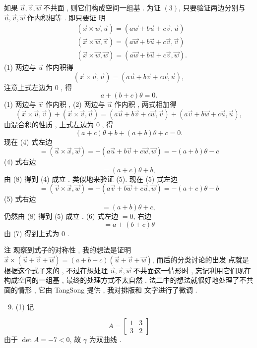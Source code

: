 \documentclass[10pt]{article}
\begin{document}
 如果  $\vec{u}, \vec{v}, \vec{w}$  不共面 ,  则它们构成空间一组基 .  为证  $(3)$,  只要验证两边分别与  $\vec{u}, \vec{v}, \vec{w}$  作内积相等 .  即只要证   明 
$$
\begin{aligned}
&(\vec{x} \times \vec{w}, \vec{u})=(a \vec{w}+b \vec{u}+c \vec{v}, \vec{u}) \\
&(\vec{x} \times \vec{w}, \vec{v})=(a \vec{w}+b \vec{u}+c \vec{v}, \vec{v}) \\
&(\vec{x} \times \vec{w}, \vec{w})=(a \vec{w}+b \vec{u}+c \vec{v}, \vec{w}) .
\end{aligned}
$$
(1)  两边与  $\vec{u}$  作内积得 
$$
(\vec{x} \times \vec{u}, \vec{u})=(a \vec{u}+b \vec{v}+c \vec{w}, \vec{u}),
$$
 注意上式左边为  0 ,  得 
$$
a+(b+c) \theta=0 .
$$
(1)  两边与  $\vec{v}$  作内积 , (2)  两边与  $\vec{u}$  作内积 ,  两式相加得 
$$
(\vec{x} \times \vec{u}, \vec{v})+(\vec{x} \times \vec{v}, \vec{u})=(a \vec{u}+b \vec{v}+c \vec{w}, \vec{v})+(a \vec{v}+b \vec{w}+c \vec{u}, \vec{u}),
$$
 由混合积的性质 ,  上式左边为  0 ,  得 
$$
(a+c) \theta+b+(a+b) \theta+c=0 .
$$
 现在  (4)  式左边 
$$
=(\vec{u} \times \vec{x}, \vec{w})=-(a \vec{u}+b \vec{v}+c \vec{w}, \vec{w})=-(a+b) \theta-c
$$
(4)  式右边 
$$
=(a+c) \theta+b,
$$
 由  (8)  得到  (4)  成立 .  类似地来验证  (5).  现在  (5)  式左边 
$$
=(\vec{v} \times \vec{x}, \vec{w})=-(a \vec{v}+b \vec{w}+c \vec{u}, \vec{w})=-(a+c) \theta-b
$$
(5)  式右边 
$$
=(a+b) \theta+c,
$$
 仍然由  (8)  得到  (5)  成立 . (6)  式左边  $=0$,  右边 
$$
=a+(b+c) \theta
$$
 由  (7)  得到上式为  0 .

 注   观察到式子的对称性 ,  我的想法是证明  $\vec{x} \times(\vec{u}+\vec{v}+\vec{w})=(a+b+c)(\vec{u}+\vec{v}+\vec{w})$,  而后的分类讨论的出发   点就是根据这个式子来的 ,  不过在想处理  $\vec{u}, \vec{v}, \vec{w}$  不共面这一情形时 ,  忘记利用它们现在构成空间的一组基 ,  最终的处理方式不太自然 .  法二中的想法就很好地处理了不共面的情形 ,  它由  TangSong  提供 ,  我对排版和   文字进行了微调 .

\begin{enumerate}
  \setcounter{enumi}{8}
  \item (1)  记 
\end{enumerate}
$$
A=\left[\begin{array}{ll}
1 & 3 \\
3 & 2
\end{array}\right]
$$
 由于  $\operatorname{det} A=-7<0$,  故  $\gamma$  为双曲线 .
\end{document}

